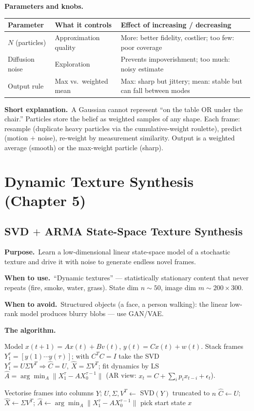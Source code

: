 \documentclass[10pt]{article}
\makeatletter
\newcommand{\Purpose}{\par\smallskip\textbf{Purpose.}\ }
\newcommand{\WhenUse}{\par\textbf{When to use.}\ }
\newcommand{\WhenAvoid}{\par\textbf{When to avoid.}\ }
\newcommand{\TheAlgo}{\par\smallskip\textbf{The algorithm.}\par\nopagebreak}
\newcommand{\Knobs}{\par\smallskip\textbf{Parameters and knobs.}\par\nopagebreak}
\newcommand{\ShortExp}{\par\smallskip\textbf{Short explanation.}\ }
\newenvironment{ptable}{\begin{center}\small\begin{tabular}{@{}p{2.5cm} p{5.9cm} p{6.2cm}@{}}\toprule
Parameter & What it controls & Effect of increasing / decreasing \\ \midrule}
{\bottomrule\end{tabular}\end{center}}
\makeatother
\begin{document}
\Knobs
\begin{ptable}
$N$ (particles) & Approximation quality & More: better fidelity, costlier; too few: poor coverage \\
Diffusion noise & Exploration & Prevents impoverishment; too much: noisy estimate \\
Output rule & Max vs.\ weighted mean & Max: sharp but jittery; mean: stable but can fall between modes \\
\end{ptable}
\ShortExp A Gaussian cannot represent ``on the table OR under the chair.'' Particles store the belief as
weighted samples of any shape. Each frame: resample (duplicate heavy particles via the cumulative-weight
roulette), predict (motion $+$ noise), re-weight by measurement similarity. Output is a weighted average
(smooth) or the max-weight particle (sharp).

\newpage
\section{Dynamic Texture Synthesis (Chapter 5)}
\subsection{SVD $+$ ARMA State-Space Texture Synthesis}\label{sub:texture}
\Purpose Learn a low-dimensional linear state-space model of a stochastic texture and drive it with noise
to generate endless novel frames.
\WhenUse ``Dynamic textures'' --- statistically stationary content that never repeats (fire, smoke, water,
grass). State dim $n\sim50$, image dim $m\sim200\times300$.
\WhenAvoid Structured objects (a face, a person walking): the linear low-rank model produces blurry blobs
--- use GAN/VAE.
\TheAlgo Model $x(t{+}1)=Ax(t)+Bv(t)$, $y(t)=Cx(t)+w(t)$. Stack frames $Y_1^\tau=[y(1)\cdots y(\tau)]$; with
$C^TC=I$ take the SVD $Y_1^\tau=U\Sigma V^T\Rightarrow\hat C=U,\ \hat X=\Sigma V^T$; fit dynamics by LS
$\hat A=\arg\min_A\|X_1^\tau-AX_0^{\tau-1}\|$ (AR view: $x_t=C+\sum_i p_ix_{t-i}+\epsilon_t$).

\begin{algorithm}[H]
\SetAlgoLined
{}
Vectorise frames into columns $Y$; $U,\Sigma,V^T\leftarrow$ SVD$(Y)$ truncated to $n$\;
$\hat C\leftarrow U$; $\hat X\leftarrow\Sigma V^T$; $\hat A\leftarrow\arg\min_A\|X_1^\tau-AX_0^{\tau-1}\|$\;
pick start state $x$\;
\caption{Dynamic-texture learning $+$ synthesis}
\end{algorithm}
\end{document}
